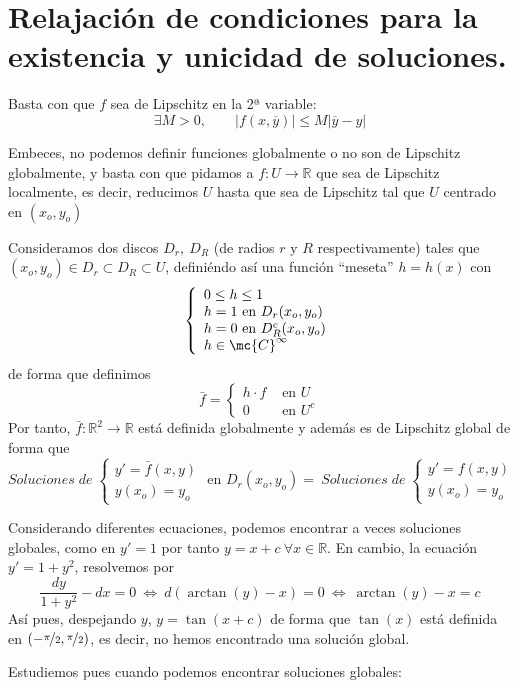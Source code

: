 \section{Relajación de condiciones para la existencia y unicidad de soluciones.}
\begin{obs}
    Basta con que $f$ sea de Lipschitz en la 2ª variable:
    $$\exists M>0, \qquad |f({x},\overline{y})|\leq M|\overline{y}-y|$$
\end{obs}
\begin{obs}
     Embeces, no podemos definir funciones globalmente o no son de Lipschitz globalmente, y basta con que pidamos a $f: U \longrightarrow \mathbb R$ que sea de Lipschitz localmente, es decir, reducimos $U$ hasta que sea de Lipschitz tal que $U$ centrado en $(x_o,y_o)$ 

     Consideramos dos discos $D_r, \: D_R$ (de radios $r$ y $R$ respectivamente) tales que $(x_o,y_o) \in D_r \subset D_R \subset U$, definiéndo así una función ``meseta'' $h=h(x)$ con 
     $$\left\{ \begin{array}{l}
          0 \leq h \leq 1  \\
          h=1 \text{ en } D_r(x_o,y_o)\\
          h=0 \text{ en } D_R^c (x_o,y_o)\\
          h \in \mc{C}^{\infty}
     \end{array}\right.$$
     de forma que definimos 
     $$\bar{f}=\left\{ \begin{array}{ll}
          h \cdot f  &\text{ en } U \\
          0 & \text{ en } U^c 
     \end{array}\right.$$
     Por tanto, $\bar{f}: \mathbb R^2 \longrightarrow \mathbb R$ está definida globalmente y además es de Lipschitz global de forma que $$Soluciones \; de \;  \left\{\begin{array}{l}
         y'=\bar{f}(x,y)  \\
         y(x_o)=y_o
    \end{array} \right. \text{ en } D_r(x_o,y_o) = \: Soluciones \; de \;  
    \left\{\begin{array}{l}
         y'=f(x,y)  \\
         y(x_o)=y_o
    \end{array} \right.$$
\end{obs}
\begin{eje}
    Considerando diferentes ecuaciones, podemos encontrar a veces soluciones globales, como en $y'=1$ por tanto $y=x+c \: \forall x \in \mathbb R$. En cambio, la ecuación $y'=1+y^2$, resolvemos por
    $$\dfrac{dy}{1+y^2}-dx=0 \: \iff \: d\left( \arctan(y)-x\right)=0 \: \iff \: \arctan(y)-x=c$$
    Así pues, despejando $y$, $y=\tan(x+c)$ de forma que $\tan(x)$ está definida en $(-\nicefrac{\pi}{2}, \nicefrac{\pi}{2})$, es decir, no hemos encontrado una solución global.

    Estudiemos pues cuando podemos encontrar soluciones globales:
\end{eje}
